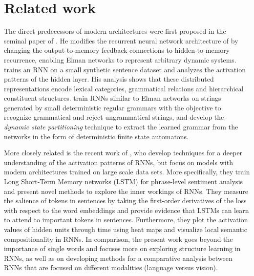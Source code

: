 \section{Related work}
\label{sec:related}

The direct predecessors of modern architectures were first proposed in the
seminal paper of \cite{elman1990finding}. He modifies the recurrent
neural network architecture of \cite{jordan1986attractor} by changing the output-to-memory
feedback connections to hidden-to-memory recurrence, enabling Elman networks to
represent arbitrary dynamic systems. \cite{elman1991distributed} trains an RNN on a small synthetic
sentence  dataset and analyzes the activation patterns of the hidden
layer. His analysis shows that these distributed representations
encode lexical categories, grammatical relations and hierarchical constituent
structures. \cite{giles1992extracting} train RNNs similar to Elman
networks on strings generated by small
deterministic regular grammars with the objective to recognize grammatical and reject ungrammatical
strings, and develop the \emph{dynamic state partitioning} technique to extract the learned
grammar from the networks in the form of deterministic finite state
automatons.


More closely related is the recent work of \cite{li2015visualizing}, who develop techniques
for a deeper understanding of the activation patterns of RNNs, but focus on models with
modern architectures trained on large scale data sets. More specifically, they train Long
Short-Term Memory networks (LSTM) \citep{hochreiter1997long}
for phrase-level sentiment analysis
and present novel methods
to explore the inner workings of RNNs. They measure the salience of tokens
in sentences by taking the first-order derivatives of the loss with respect to the
word embeddings and provide evidence
that LSTMs can learn to attend to important tokens in sentences. Furthermore,
they plot the activation values of hidden units through time using heat maps
and visualize local semantic compositionality in RNNs.
In comparison, the present work goes beyond the importance of single words and focuses more on exploring structure
learning in RNNs, as well as on developing methods for a comparative analysis between RNNs that are focused on different modalities (language versus vision).

